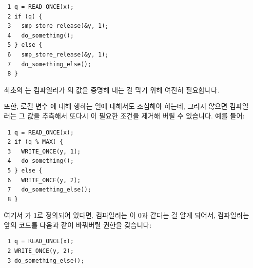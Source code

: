 \vspace{5pt}
\begin{minipage}[t]{\columnwidth}
\scriptsize
\begin{verbatim}
 1 q = READ_ONCE(x);
 2 if (q) {
 3   smp_store_release(&y, 1);
 4   do_something();
 5 } else {
 6   smp_store_release(&y, 1);
 7   do_something_else();
 8 }
\end{verbatim}
\end{minipage}
\vspace{5pt}

최초의  는 컴파일러가  의 값을 증명해 내는 걸 막기 위해
여전히 필요합니다.

또한, 로컬 변수  에 대해 행하는 일에 대해서도 조심해야 하는데, 그러지
않으면 컴파일러는 그 값을 추측해서 또다시 이 필요한 조건을 제거해 버릴 수
있습니다.
예를 들어:

\vspace{5pt}
\begin{minipage}[t]{\columnwidth}
\scriptsize
\begin{verbatim}
 1 q = READ_ONCE(x);
 2 if (q % MAX) {
 3   WRITE_ONCE(y, 1);
 4   do_something();
 5 } else {
 6   WRITE_ONCE(y, 2);
 7   do_something_else();
 8 }
\end{verbatim}
\end{minipage}
\vspace{5pt}

여기서  가 1로 정의되어 있다면, 컴파일러는  이 0과 같다는
걸 알게 되어서, 컴파일러는 앞의 코드를 다음과 같이 바꿔버릴 권한을 갖습니다:

\vspace{5pt}
\begin{minipage}[t]{\columnwidth}
\scriptsize
\begin{verbatim}
 1 q = READ_ONCE(x);
 2 WRITE_ONCE(y, 2);
 3 do_something_else();
\end{verbatim}
\end{minipage}
\vspace{5pt}

